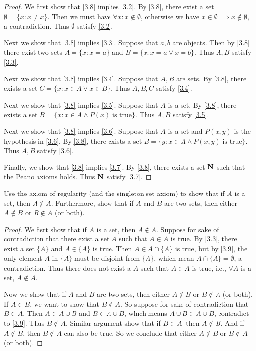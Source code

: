 \begin{proof}
  We first show that \cref{3.8} implies \cref{3.2}.
  By \cref{3.8}, there exist a set \(\emptyset = \{x: x \neq x\}\).
  Then we must have \(\forall x : x \notin \emptyset\), otherwise we have \(x \in \emptyset \implies x \notin \emptyset\), a contradiction.
  Thus \(\emptyset\) satisfy \cref{3.2}.

  Next we show that \cref{3.8} implies \cref{3.3}.
  Suppose that \(a, b\) are objects.
  Then by \cref{3.8} there exist two sets \(A = \{x: x = a\}\) and \(B = \{x: x = a \lor x = b\}\).
  Thus \(A, B\) satisfy \cref{3.3}.

  Next we show that \cref{3.8} implies \cref{3.4}.
  Suppose that \(A, B\) are sets.
  By \cref{3.8}, there exists a set \(C = \{x : x \in A \lor x \in B\}\).
  Thus \(A, B, C\) satisfy \cref{3.4}.

  Next we show that \cref{3.8} implies \cref{3.5}.
  Suppose that \(A\) is a set.
  By \cref{3.8}, there exists a set \(B = \{x : x \in A \land P(x) \text{ is true}\}\).
  Thus \(A, B\) satisfy \cref{3.5}.

  Next we show that \cref{3.8} implies \cref{3.6}.
  Suppose that \(A\) is a set and \(P(x, y)\) is the hypothesis in \cref{3.6}.
  By \cref{3.8}, there exists a set \(B = \{y :  x \in A \land P(x, y) \text{ is true}\}\).
  Thus \(A, B\) satisfy \cref{3.6}.

  Finally, we show that \cref{3.8} implies \cref{3.7}.
  By \cref{3.8}, there exists a set \(\mathbf{N}\) such that the Peano axioms holds.
  Thus \(\mathbf{N}\) satisfy \cref{3.7}.
\end{proof}

\begin{exercise}\label{ex 3.2.2}
  Use the axiom of regularity (and the singleton set axiom) to show that if \(A\) is a set, then \(A \notin A\).
  Furthermore, show that if \(A\) and \(B\) are two sets, then either \(A \notin B\) or \(B \notin A\) (or both).
\end{exercise}

\begin{proof}
  We fisrt show that if \(A\) is a set, then \(A \notin A\).
  Suppose for sake of contradiction that there exist a set \(A\) such that \(A \in A\) is true.
  By \cref{3.3}, there exist a set \(\{A\}\) and \(A \in \{A\}\) is true.
  Then \(A \in A \cap \{A\}\) is true, but by \cref{3.9}, the only element \(A\) in \(\{A\}\) must be disjoint from \(\{A\}\), which mean \(A \cap \{A\} = \emptyset\), a contradiction.
  Thus there does not exist a \(A\) such that \(A \in A\) is true, i.e., \(\forall A\) is a set, \(A \notin A\).

  Now we show that if \(A\) and \(B\) are two sets, then either \(A \notin B\) or \(B \notin A\) (or both).
  If \(A \in B\), we want to show that \(B \notin A\).
  So suppose for sake of contradiction that \(B \in A\).
  Then \(A \in A \cup B\) and \(B \in A \cup B\), which means \(A \cup B \in A \cup B\), contradict to \cref{3.9}.
  Thus \(B \notin A\).
  Similar argument show that if \(B \in A\), then \(A \notin B\).
  And if \(A \notin B\), then \(B \notin A\) can also be true.
  So we conclude that either \(A \notin B\) or \(B \notin A\) (or both).
\end{proof}

